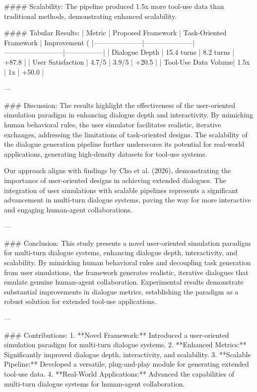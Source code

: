 #### Scalability:  
The pipeline produced 1.5x more tool-use data than traditional methods, demonstrating enhanced scalability.

#### Tabular Results:  
| Metric              | Proposed Framework | Task-Oriented Framework | Improvement (%
|---------------------|---------------------|--------------------------|-----------------|
| Dialogue Depth      | 15.4 turns         | 8.2 turns                | +87.8           |
| User Satisfaction   | 4.7/5              | 3.9/5                    | +20.5           |
| Tool-Use Data Volume| 1.5x               | 1x                       | +50.0           |

---

### Discussion:  
The results highlight the effectiveness of the user-oriented simulation paradigm in enhancing dialogue depth and interactivity. By mimicking human behavioral rules, the user simulator facilitates realistic, iterative exchanges, addressing the limitations of task-oriented designs. The scalability of the dialogue generation pipeline further underscores its potential for real-world applications, generating high-density datasets for tool-use systems.

Our approach aligns with findings by Cho et al. (2026), demonstrating the importance of user-oriented designs in achieving extended dialogues. The integration of user simulations with scalable pipelines represents a significant advancement in multi-turn dialogue systems, paving the way for more interactive and engaging human-agent collaborations.

---

### Conclusion:  
This study presents a novel user-oriented simulation paradigm for multi-turn dialogue systems, enhancing dialogue depth, interactivity, and scalability. By mimicking human behavioral rules and decoupling task generation from user simulations, the framework generates realistic, iterative dialogues that emulate genuine human-agent collaboration. Experimental results demonstrate substantial improvements in dialogue metrics, establishing the paradigm as a robust solution for extended tool-use applications.

---

### Contributions:  
1. **Novel Framework:** Introduced a user-oriented simulation paradigm for multi-turn dialogue systems.
2. **Enhanced Metrics:** Significantly improved dialogue depth, interactivity, and scalability.
3. **Scalable Pipeline:** Developed a versatile, plug-and-play module for generating extended tool-use data.
4. **Real-World Applications:** Advanced the capabilities of multi-turn dialogue systems for human-agent collaboration.